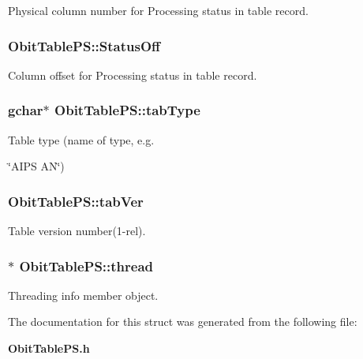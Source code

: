Physical column number for Processing status in table record. 

\subsubsection{ {\bf Obit\-Table\-PS::Status\-Off}}\label{structObitTablePS_o28}


Column offset for Processing status in table record. 

\subsubsection{\setlength{\rightskip}{0pt plus 5cm}gchar$\ast$ {\bf Obit\-Table\-PS::tab\-Type}}\label{structObitTablePS_o12}


Table type (name of type, e.g. 

\char`\"{}AIPS AN\char`\"{}) 
\subsubsection{ {\bf Obit\-Table\-PS::tab\-Ver}}\label{structObitTablePS_o13}


Table version number(1-rel). 

\subsubsection{$\ast$ {\bf Obit\-Table\-PS::thread}}\label{structObitTablePS_o4}


Threading info member object. 



The documentation for this struct was generated from the following file:\begin{CompactItemize}
\item 
{\bf Obit\-Table\-PS.h}\end{CompactItemize}

